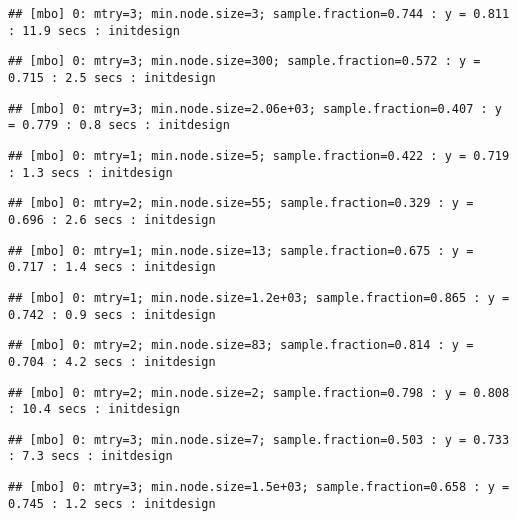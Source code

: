 \documentclass[
]{article}
\begin{document}
\begin{verbatim}
## [mbo] 0: mtry=3; min.node.size=3; sample.fraction=0.744 : y = 0.811 : 11.9 secs : initdesign
\end{verbatim}

\begin{verbatim}
## [mbo] 0: mtry=3; min.node.size=300; sample.fraction=0.572 : y = 0.715 : 2.5 secs : initdesign
\end{verbatim}

\begin{verbatim}
## [mbo] 0: mtry=3; min.node.size=2.06e+03; sample.fraction=0.407 : y = 0.779 : 0.8 secs : initdesign
\end{verbatim}

\begin{verbatim}
## [mbo] 0: mtry=1; min.node.size=5; sample.fraction=0.422 : y = 0.719 : 1.3 secs : initdesign
\end{verbatim}

\begin{verbatim}
## [mbo] 0: mtry=2; min.node.size=55; sample.fraction=0.329 : y = 0.696 : 2.6 secs : initdesign
\end{verbatim}

\begin{verbatim}
## [mbo] 0: mtry=1; min.node.size=13; sample.fraction=0.675 : y = 0.717 : 1.4 secs : initdesign
\end{verbatim}

\begin{verbatim}
## [mbo] 0: mtry=1; min.node.size=1.2e+03; sample.fraction=0.865 : y = 0.742 : 0.9 secs : initdesign
\end{verbatim}

\begin{verbatim}
## [mbo] 0: mtry=2; min.node.size=83; sample.fraction=0.814 : y = 0.704 : 4.2 secs : initdesign
\end{verbatim}

\begin{verbatim}
## [mbo] 0: mtry=2; min.node.size=2; sample.fraction=0.798 : y = 0.808 : 10.4 secs : initdesign
\end{verbatim}

\begin{verbatim}
## [mbo] 0: mtry=3; min.node.size=7; sample.fraction=0.503 : y = 0.733 : 7.3 secs : initdesign
\end{verbatim}

\begin{verbatim}
## [mbo] 0: mtry=3; min.node.size=1.5e+03; sample.fraction=0.658 : y = 0.745 : 1.2 secs : initdesign
\end{verbatim}
\end{document}
